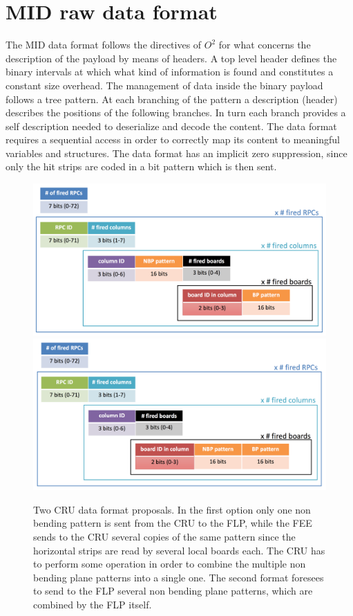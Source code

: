 \section{MID raw data format}
The MID data format follows the directives of $O^2$ for what concerns the description of the payload by means of headers.
A top level header defines the binary intervals at which what kind of information is found and constitutes a constant size overhead.
The management of data inside the binary payload follows a tree pattern.
At each branching of the pattern a description (header) describes the positions of the following branches.
In turn each branch provides a self description needed to deserialize and decode the content.
The data format requires a sequential access in order to correctly map its content to meaningful variables and structures.
The data format has an implicit zero suppression, since only the hit strips are coded in a bit pattern which is then sent.

\begin{figure}[!ht]
\begin{center}
\includegraphics[width=0.99\linewidth]{Chapters/O2/Figs/MID_format_2.pdf}
\includegraphics[width=0.99\linewidth]{Chapters/O2/Figs/MID_format_1.pdf}
\caption{Two CRU data format proposals. 
In the first option only one non bending pattern is sent from the CRU to the FLP, while the FEE sends to the CRU several copies of the same pattern since the horizontal strips are read by several local boards each. The CRU has to perform some operation in order to combine the multiple non bending plane patterns into a single one.
The second format foresees to send to the FLP several non bending plane patterns, which are combined by the FLP itself.}
\label{fig:MID_CRU_DF}
\end{center}
\end{figure}

